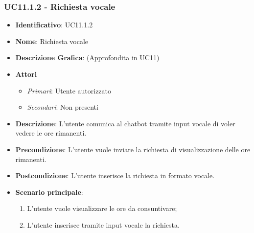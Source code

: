 \subsubsection{UC11.1.2 - Richiesta vocale}
\begin{itemize}
	\item \textbf{Identificativo}: UC11.1.2
	\item \textbf{Nome}: Richiesta vocale
	\item \textbf{Descrizione Grafica}: (Approfondita in UC11)
	\item \textbf{Attori}
	\begin{itemize} 
		\item \textit{Primari}: Utente autorizzato
		\item \textit{Secondari}: Non presenti
	\end{itemize}
	\item \textbf{Descrizione}: L'utente comunica al chatbot tramite input vocale di voler vedere le ore rimanenti.
	\item \textbf{Precondizione}: L'utente vuole inviare la richiesta di visualizzazione delle ore rimanenti.
	\item \textbf{Postcondizione}: L'utente inserisce la richiesta in formato vocale.
	\item \textbf{Scenario principale}:
	\begin{enumerate}
		\item L'utente vuole visualizzare le ore da consuntivare;
		\item L'utente inserisce tramite input vocale la richiesta.
	\end{enumerate}
\end{itemize}

